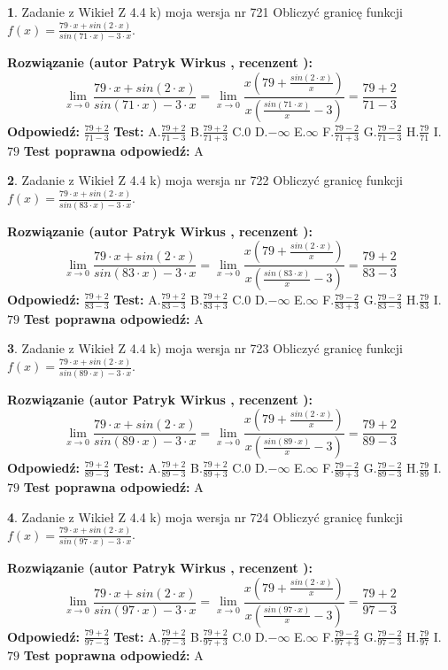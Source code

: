 \documentclass[12pt, a4paper]{article}
\theoremstyle{definition} %
\newtheorem{zad}{}
\newcommand{\zadStart}[1]{\begin{zad}#1\newline}
\newcommand{\zadStop}{\end{zad}}
\newcommand{\rozwStart}[2]{\noindent \textbf{Rozwiązanie (autor #1 , recenzent #2): }\newline}
\newcommand{\rozwStop}{\newline}
\newcommand{\odpStart}{\noindent \textbf{Odpowiedź:}\newline}
\newcommand{\odpStop}{\newline}
\newcommand{\testStart}{\noindent \textbf{Test:}\newline}
\newcommand{\testStop}{\newline}
\newcommand{\kluczStart}{\noindent \textbf{Test poprawna odpowiedź:}\newline}
\newcommand{\kluczStop}{\newline}
\begin{document}
\zadStart{Zadanie z Wikieł Z 4.4 k) moja wersja nr 721}
Obliczyć granicę funkcji $f(x)=\frac{79\cdot x +sin(2\cdot x)}{sin(71\cdot x) -3\cdot x}$.
\zadStop
\rozwStart{Patryk Wirkus}{}
$$\lim\limits_{x\to 0}\frac{79\cdot x +sin(2\cdot x)}{sin(71\cdot x) -3\cdot x}
=\lim\limits_{x\to 0}\frac{x(79+\frac{sin(2\cdot x)}{x})}{x(\frac{sin(71\cdot x)}{x}-3)}
=\frac{79+2}{71-3}$$
\rozwStop
\odpStart
$\frac{79+2}{71-3}$
\odpStop
\testStart
A.$\frac{79+2}{71-3}$
B.$\frac{79+2}{71+3}$
C.$0$
D.$-\infty$
E.$\infty$
F.$\frac{79-2}{71+3}$
G.$\frac{79-2}{71-3}$
H.$\frac{79}{71}$
I.$79$
\testStop
\kluczStart
A
\kluczStop



\zadStart{Zadanie z Wikieł Z 4.4 k) moja wersja nr 722}
Obliczyć granicę funkcji $f(x)=\frac{79\cdot x +sin(2\cdot x)}{sin(83\cdot x) -3\cdot x}$.
\zadStop
\rozwStart{Patryk Wirkus}{}
$$\lim\limits_{x\to 0}\frac{79\cdot x +sin(2\cdot x)}{sin(83\cdot x) -3\cdot x}
=\lim\limits_{x\to 0}\frac{x(79+\frac{sin(2\cdot x)}{x})}{x(\frac{sin(83\cdot x)}{x}-3)}
=\frac{79+2}{83-3}$$
\rozwStop
\odpStart
$\frac{79+2}{83-3}$
\odpStop
\testStart
A.$\frac{79+2}{83-3}$
B.$\frac{79+2}{83+3}$
C.$0$
D.$-\infty$
E.$\infty$
F.$\frac{79-2}{83+3}$
G.$\frac{79-2}{83-3}$
H.$\frac{79}{83}$
I.$79$
\testStop
\kluczStart
A
\kluczStop



\zadStart{Zadanie z Wikieł Z 4.4 k) moja wersja nr 723}
Obliczyć granicę funkcji $f(x)=\frac{79\cdot x +sin(2\cdot x)}{sin(89\cdot x) -3\cdot x}$.
\zadStop
\rozwStart{Patryk Wirkus}{}
$$\lim\limits_{x\to 0}\frac{79\cdot x +sin(2\cdot x)}{sin(89\cdot x) -3\cdot x}
=\lim\limits_{x\to 0}\frac{x(79+\frac{sin(2\cdot x)}{x})}{x(\frac{sin(89\cdot x)}{x}-3)}
=\frac{79+2}{89-3}$$
\rozwStop
\odpStart
$\frac{79+2}{89-3}$
\odpStop
\testStart
A.$\frac{79+2}{89-3}$
B.$\frac{79+2}{89+3}$
C.$0$
D.$-\infty$
E.$\infty$
F.$\frac{79-2}{89+3}$
G.$\frac{79-2}{89-3}$
H.$\frac{79}{89}$
I.$79$
\testStop
\kluczStart
A
\kluczStop



\zadStart{Zadanie z Wikieł Z 4.4 k) moja wersja nr 724}
Obliczyć granicę funkcji $f(x)=\frac{79\cdot x +sin(2\cdot x)}{sin(97\cdot x) -3\cdot x}$.
\zadStop
\rozwStart{Patryk Wirkus}{}
$$\lim\limits_{x\to 0}\frac{79\cdot x +sin(2\cdot x)}{sin(97\cdot x) -3\cdot x}
=\lim\limits_{x\to 0}\frac{x(79+\frac{sin(2\cdot x)}{x})}{x(\frac{sin(97\cdot x)}{x}-3)}
=\frac{79+2}{97-3}$$
\rozwStop
\odpStart
$\frac{79+2}{97-3}$
\odpStop
\testStart
A.$\frac{79+2}{97-3}$
B.$\frac{79+2}{97+3}$
C.$0$
D.$-\infty$
E.$\infty$
F.$\frac{79-2}{97+3}$
G.$\frac{79-2}{97-3}$
H.$\frac{79}{97}$
I.$79$
\testStop
\kluczStart
A
\kluczStop
\end{document}
